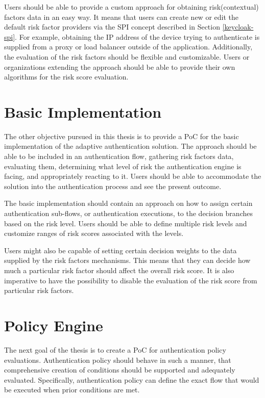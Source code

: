 Users should be able to provide a custom approach for obtaining risk(contextual) factors data in an easy way.
It means that users can create new or edit the default risk factor providers via the SPI concept described in Section \ref{keycloak-spi}.
For example, obtaining the IP address of the device trying to authenticate is supplied from a proxy or load balancer outside of the application.
Additionally, the evaluation of the risk factors should be flexible and customizable.
Users or organizations extending the approach should be able to provide their own algorithms for the risk score evaluation.

\section{Basic Implementation}
The other objective pursued in this thesis is to provide a PoC for the basic implementation of the adaptive authentication solution.
The approach should be able to be included in an authentication flow, gathering risk factors data, evaluating them, determining what level of risk the authentication engine is facing, and appropriately reacting to it.
Users should be able to accommodate the solution into the authentication process and see the present outcome.

The basic implementation should contain an approach on how to assign certain authentication sub-flows, or authentication executions, to the decision branches based on the risk level.
Users should be able to define multiple risk levels and customize ranges of risk scores associated with the levels.

Users might also be capable of setting certain decision weights to the data supplied by the risk factors mechanisms.
This means that they can decide how much a particular risk factor should affect the overall risk score.
It is also imperative to have the possibility to disable the evaluation of the risk score from particular risk factors.

\section{Policy Engine}
The next goal of the thesis is to create a PoC for authentication policy evaluations.
Authentication policy should behave in such a manner, that comprehensive creation of conditions should be supported and adequately evaluated.
Specifically, authentication policy can define the exact flow that would be executed when prior conditions are met.

